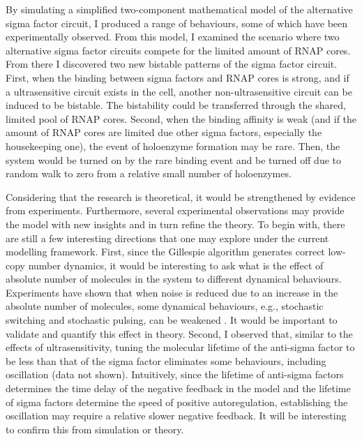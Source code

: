 By simulating a simplified two-component mathematical model
of the alternative sigma factor circuit, I produced a range of
behaviours, some of which have been experimentally observed.
From this model, I examined the scenario where two alternative sigma
factor circuits compete for the limited amount of RNAP cores.
From there I discovered two new bistable patterns of 
the sigma factor circuit.
First, when the binding between sigma factors and RNAP cores
is strong, and if a ultrasensitive circuit exists in the cell,
another non-ultrasensitive circuit can be induced to be bistable.
The bistability could be transferred through the shared, limited
pool of RNAP cores.
Second, when the binding affinity is weak (and if the amount of 
RNAP cores are limited due other sigma factors, especially
the housekeeping one), the event of holoenzyme formation may be
rare. Then, the system would be turned on by the rare binding event
and be turned off due to random walk to zero from a relative small number
of holoenzymes.

Considering that the research is theoretical, it would
be strengthened by evidence from experiments.
Furthermore, several experimental observations may provide the
model with new insights and in turn refine the theory.
To begin with, there are still a few interesting directions that
one may explore under the current modelling framework.
First, since the Gillespie algorithm generates correct low-copy number dynamics, 
it would be interesting to ask what is the effect of absolute 
number of molecules in the system to different dynamical behaviours.
Experiments have shown that when noise is reduced due to an
increase in the absolute number of molecules, some dynamical 
behaviours, e.g., stochastic switching and stochastic pulsing,
can be weakened \cite{suel06, locke11}.
It would be important to validate and quantify this effect in theory.
Second, I observed that, similar to the effects of ultrasensitivity,
tuning the molecular lifetime of the anti-sigma factor to be
less than that of the sigma factor eliminates some behaviours,
including oscillation (data not shown).
Intuitively, since the lifetime of anti-sigma factors determines the
time delay of the negative feedback in the model and the lifetime
of sigma factors determine the speed of positive autoregulation,
establishing the oscillation may require a relative slower
negative feedback.
It will be interesting to confirm this from simulation or theory.

